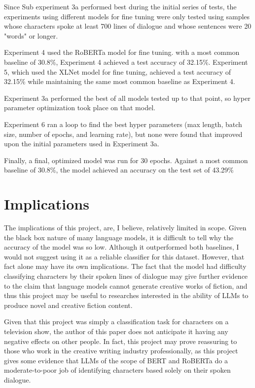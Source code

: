 \documentclass[11pt]{article}
\begin{document}
Since Sub experiment 3a performed best during the initial series of tests, the experiments using different models for fine tuning were only tested using samples whose characters spoke at least 700 lines of dialogue and whose sentences were 20 "words" or longer.

Experiment 4 used the RoBERTa model for fine tuning. with a most common baseline of 30.8\%, Experiment 4 achieved a test accuracy of 32.15\%. Experiment 5, which used the XLNet model for fine tuning, achieved a test accuracy of 32.15\% while maintaining the same most common baseline as Experiment 4.

Experiment 3a performed the best of all models tested up to that point, so hyper parameter optimization took place on that model.

Experiment 6 ran a loop to find the best hyper parameters (max length, batch size, number of epochs, and learning rate), but none were found that improved upon the initial parameters used in Experiment 3a.

Finally, a final, optimized model was run for 30 epochs. Against a most common baseline of 30.8\%, the model achieved an accuracy on the test set of 43.29\%

\section{Implications}

The implications of this project, are, I believe, relatively limited in scope. Given the black box nature of many language models, it is difficult to tell why the accuracy of the model was so low. Although it outperformed both baselines, I would not suggest using it as a reliable classifier for this dataset. However, that fact alone may have its own implications. The fact that the model had difficulty classifying characters by their spoken lines of dialogue may give further evidence to the claim that language models cannot generate creative works of fiction, and thus this project may be useful to researches interested in the ability of LLMs to produce novel and creative fiction content. 

Given that this project was simply a classification task for characters on a television show, the author of this paper does not anticipate it having any negative effects on other people. In fact, this project may prove reassuring to those who work in the creative writing industry professionally, as this project gives some evidence that LLMs of the scope of BERT and RoBERTa do a moderate-to-poor job of identifying characters based solely on their spoken dialogue.
\end{document}
